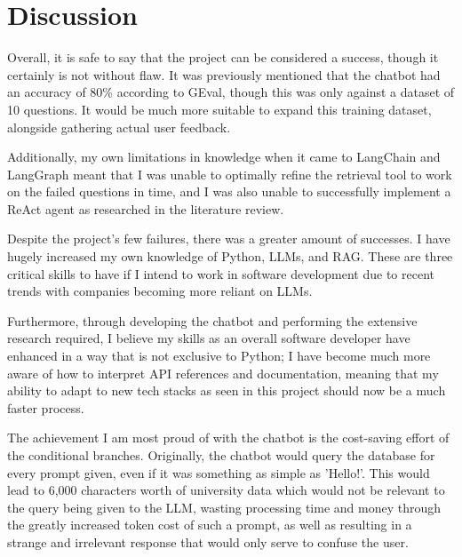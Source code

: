 \section{Discussion}
Overall, it is safe to say that the project can be considered a success, though it certainly is not without flaw.
It was previously mentioned that the chatbot had an accuracy of 80\% according to GEval, though this was only against a dataset 
of 10 questions. It would be much more suitable to expand this training dataset, alongside gathering actual user feedback.

\para Additionally, my own limitations in knowledge when it came to LangChain and LangGraph meant that I was unable to optimally refine the 
retrieval tool to work on the failed questions in time, and I was also unable to successfully implement a ReAct agent as researched in the 
literature review.

\para Despite the project's few failures, there was a greater amount of successes. I have hugely increased my own knowledge of Python, LLMs,
and RAG. These are three critical skills to have if I intend to work in software development due to recent trends with companies 
becoming more reliant on LLMs. 

\para Furthermore, through developing the chatbot and performing the extensive research required, I believe my skills as an overall software 
developer have enhanced in a way that is not exclusive to Python; I have become much more aware of how to interpret API references and documentation,
meaning that my ability to adapt to new tech stacks as seen in this project should now be a much faster process.

\para The achievement I am most proud of with the chatbot is the cost-saving effort of the conditional branches. Originally, the chatbot would 
query the database for every prompt given, even if it was something as simple as 'Hello!'. This would lead to 6,000 characters worth of university
data which would not be relevant to the query being given to the LLM, wasting processing time and money through the greatly increased token cost 
of such a prompt, as well as resulting in a strange and irrelevant response that would only serve to confuse the user. 